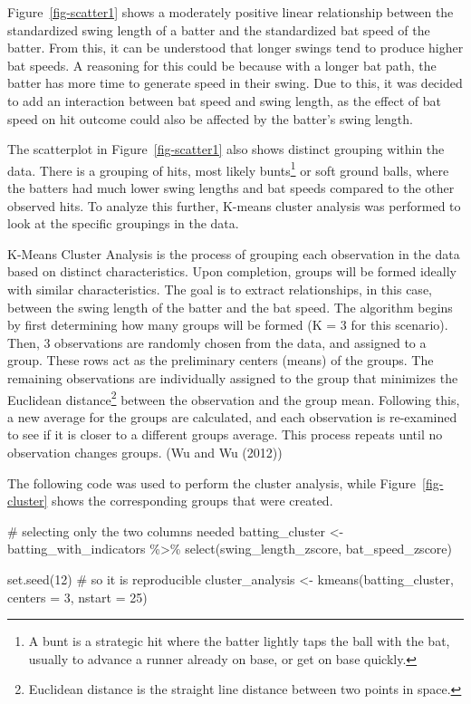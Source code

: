 \documentclass[
  letterpaper,
  DIV=11,
  numbers=noendperiod]{scrartcl}
\newenvironment{Shaded}{\begin{snugshade}}{\end{snugshade}}
\newcommand{\AttributeTok}[1]{\textcolor[rgb]{0.40,0.45,0.13}{#1}}
\newcommand{\CommentTok}[1]{\textcolor[rgb]{0.37,0.37,0.37}{#1}}
\newcommand{\DecValTok}[1]{\textcolor[rgb]{0.68,0.00,0.00}{#1}}
\newcommand{\FunctionTok}[1]{\textcolor[rgb]{0.28,0.35,0.67}{#1}}
\newcommand{\NormalTok}[1]{\textcolor[rgb]{0.00,0.23,0.31}{#1}}
\newcommand{\OtherTok}[1]{\textcolor[rgb]{0.00,0.23,0.31}{#1}}
\newcommand{\SpecialCharTok}[1]{\textcolor[rgb]{0.37,0.37,0.37}{#1}}
\begin{document}
Figure~\ref{fig-scatter1} shows a moderately positive linear
relationship between the standardized swing length of a batter and the
standardized bat speed of the batter. From this, it can be understood
that longer swings tend to produce higher bat speeds. A reasoning for
this could be because with a longer bat path, the batter has more time
to generate speed in their swing. Due to this, it was decided to add an
interaction between bat speed and swing length, as the effect of bat
speed on hit outcome could also be affected by the batter's swing
length.

The scatterplot in Figure~\ref{fig-scatter1} also shows distinct
grouping within the data. There is a grouping of hits, most likely
bunts\footnote{A bunt is a strategic hit where the batter lightly taps
  the ball with the bat, usually to advance a runner already on base, or
  get on base quickly.} or soft ground balls, where the batters had much
lower swing lengths and bat speeds compared to the other observed hits.
To analyze this further, K-means cluster analysis was performed to look
at the specific groupings in the data.

K-Means Cluster Analysis is the process of grouping each observation in
the data based on distinct characteristics. Upon completion, groups will
be formed ideally with similar characteristics. The goal is to extract
relationships, in this case, between the swing length of the batter and
the bat speed. The algorithm begins by first determining how many groups
will be formed (K = 3 for this scenario). Then, 3 observations are
randomly chosen from the data, and assigned to a group. These rows act
as the preliminary centers (means) of the groups. The remaining
observations are individually assigned to the group that minimizes the
Euclidean distance\footnote{Euclidean distance is the straight line
  distance between two points in space.} between the observation and the
group mean. Following this, a new average for the groups are calculated,
and each observation is re-examined to see if it is closer to a
different groups average. This process repeats until no observation
changes groups. (Wu and Wu (2012))

The following code was used to perform the cluster analysis, while
Figure~\ref{fig-cluster} shows the corresponding groups that were
created.

\begin{Shaded}
\begin{Highlighting}[]
\CommentTok{\# selecting only the two columns needed}
\NormalTok{batting\_cluster }\OtherTok{\textless{}{-}}\NormalTok{ batting\_with\_indicators }\SpecialCharTok{\%\textgreater{}\%}
  \FunctionTok{select}\NormalTok{(swing\_length\_zscore,}
\NormalTok{         bat\_speed\_zscore)}

\FunctionTok{set.seed}\NormalTok{(}\DecValTok{12}\NormalTok{) }\CommentTok{\# so it is reproducible}
\NormalTok{cluster\_analysis }\OtherTok{\textless{}{-}} \FunctionTok{kmeans}\NormalTok{(batting\_cluster,}
                           \AttributeTok{centers =} \DecValTok{3}\NormalTok{,}
                           \AttributeTok{nstart =} \DecValTok{25}\NormalTok{)}
\end{Highlighting}
\end{Shaded}
\end{document}
